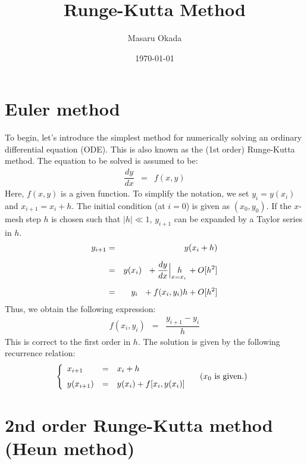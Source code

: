 \documentclass[uplatex,a4j,12pt,dvipdfmx]{jsarticle}
\title{Runge-Kutta Method}
\author{Masaru Okada}
\date{\today}
\begin{document}
\maketitle

\section{Euler method}

To begin, let's introduce the simplest method for numerically solving
an ordinary differential equation (ODE).
This is also known as the (1st order) Runge-Kutta method.
The equation to be solved is assumed to be:
\begin{eqnarray}
	\dfrac{dy}{dx} &=& f(x,y)
\end{eqnarray}
Here, $f(x,y)$ is a given function.
To simplify the notation,
we set $y_{i}=y(x_{i})$
and
$x_{i+1} = x_{i} + h$.
The initial condition (at $i=0$) is given as $(x_{0},y_{0})$.
If the $x$-mesh step $h$ is chosen such that $| h | \ll 1$,
$y_{i+1}$ can be expanded by a Taylor series in $h$.
\begin{eqnarray}
	y_{i+1} &=&
	y(x_{i} + h)
	\nonumber \\[2mm] &=&
	y(x_{i}) \ \
	+
	\dfrac{dy}{dx} \Big|_{x=x_{i}} \hspace{-4mm} h \ \
	+
	O[h^{2}]
	\nonumber \\[2mm] &=&
	y_{i} \ \
	+
	f(x_{i},y_{i}) h
	+
	O[h^{2}]
\end{eqnarray}
Thus, we obtain the following expression:
\begin{eqnarray}
	f(x_{i},y_{i}) &=& \dfrac{y_{i+1} - y_{i}}{h}
\end{eqnarray}
This is correct to the first order in $h$.
The solution is given by the following recurrence relation:
\begin{eqnarray}
	\left\{
	\begin{array}{lcl}
		x_{i+1}    & = & x_{i} + h                                 \\[-1mm]
		           &   & \hspace{35mm} ( x_{0} \text{ is given.} ) \\[-1mm]
		y(x_{i+1}) & = & y(x_{i}) + f[x_{i},y(x_{i})]
	\end{array}
	\right.
\end{eqnarray}

\section{2nd order Runge-Kutta method (Heun method)}
\end{document}
